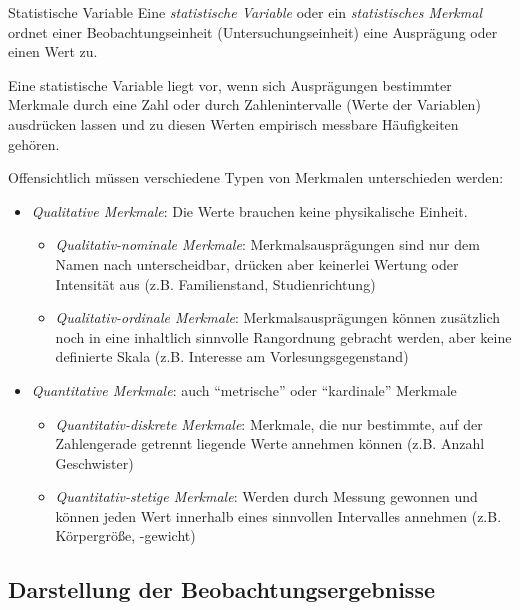 \begin{defi}{Statistische Variable}
    Eine \emph{statistische Variable} oder ein \emph{statistisches Merkmal} ordnet einer Beobachtungseinheit (Untersuchungseinheit) eine Ausprägung oder einen Wert zu.

    Eine statistische Variable liegt vor, wenn sich Ausprägungen bestimmter Merkmale durch eine Zahl oder durch Zahlenintervalle (Werte der Variablen) ausdrücken lassen und zu diesen Werten empirisch messbare Häufigkeiten gehören.

    Offensichtlich müssen verschiedene Typen von Merkmalen unterschieden werden:
    \begin{itemize}
        \item \emph{Qualitative Merkmale}:
              Die Werte brauchen keine physikalische Einheit.
              \begin{itemize}
                  \item \emph{Qualitativ-nominale Merkmale}:
                        Merkmalsausprägungen sind nur dem Namen nach unterscheidbar, drücken aber keinerlei Wertung oder Intensität aus (z.B. Familienstand, Studienrichtung)
                  \item \emph{Qualitativ-ordinale Merkmale}:
                        Merkmalsausprägungen können zusätzlich noch in eine inhaltlich sinnvolle Rangordnung gebracht werden, aber keine definierte Skala (z.B. Interesse am Vorlesungsgegenstand)
              \end{itemize}
        \item \emph{Quantitative Merkmale}:
              auch \enquote{metrische} oder \enquote{kardinale} Merkmale
              \begin{itemize}
                  \item \emph{Quantitativ-diskrete Merkmale}:
                        Merkmale, die nur bestimmte, auf der Zahlengerade getrennt liegende Werte annehmen können (z.B. Anzahl Geschwister)
                  \item \emph{Quantitativ-stetige Merkmale}:
                        Werden durch Messung gewonnen und können jeden Wert innerhalb eines sinnvollen Intervalles annehmen (z.B. Körpergröße, -gewicht)
              \end{itemize}
    \end{itemize}
\end{defi}

\subsection{Darstellung der Beobachtungsergebnisse}


